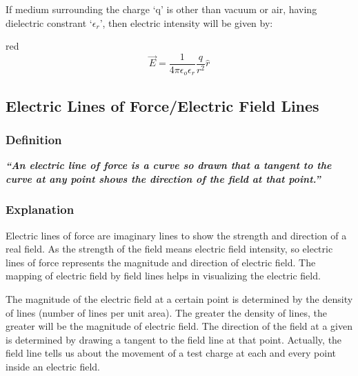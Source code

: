 If medium surrounding the charge ‘q’ is other than vacuum or air,
having dielectric constrant
`$\epsilon_{r}$', then electric intensity will be given by:
\begin{mybox}{red}{}
\begin{equation}\label{eq:11.16}
  \vec{E} = \frac{1}{4\pi\epsilon_{o}\epsilon_{r}} \frac{q}{r^{2}} \hat{r}
\end{equation}
\end{mybox}
\subsection{Electric Lines of Force/Electric Field Lines}
\subsubsection{Definition}
\textit{\textbf{“An electric line of force is a curve so drawn that a tangent to the curve at any point
shows the direction of the field at that point.”}}
\subsubsection{Explanation}
Electric lines of force are imaginary lines to show the strength
and direction of a real field. As the strength of the field means
electric field intensity, so electric lines of force represents the
magnitude and direction of electric field. The mapping of electric
field by field lines helps in visualizing the electric field.

The magnitude of the electric field at a certain point is
determined by the density of lines (number of lines per unit area).
The greater the density of lines, the greater will be the magnitude
of electric field. The direction of the field at a given is determined
by drawing a tangent to the field line at that point. Actually,
the field line tells us about the movement of a test charge at
each and every point inside an electric field.
